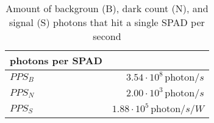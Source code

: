 \begin{table}[H]
\centering
\caption{Amount of backgroun (B), dark count (N), and signal (S) photons that hit a single SPAD per second}
\label{tab:photons_per_SPAD}
\begin{tabular}{|l|r|}\hline
    \textbf{photons per SPAD} & \\
    \hline 
    $PPS_B$ & $3.54\cdot10^{8}\, \text{photon}/s$ \\
    $PPS_N$ & $2.00\cdot10^{3}\, \text{photon}/s$ \\
    $PPS_S$ & $1.88\cdot10^{5}\, \text{photon}/s/W$ \\
    \hline 
\end{tabular}
\end{table}
